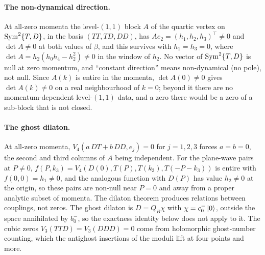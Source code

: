 \paragraph{The non-dynamical direction.}
At all-zero momenta the level-$(1, 1)$ block $A$ of the quartic vertex on $\operatorname{Sym}^2 \{T, D\}$, in the basis $(TT, TD, DD)$, has $A e_2 = (h_1, h_2, h_3)^\top \ne 0$ and $\det A \ne 0$ at both values of $\beta$, and this survives with $h_1 = h_3 = 0$, where $\det A = h_2 (h_0 h_4 - h_2^2) \ne 0$ in the window of $h_2$.
No vector of $\operatorname{Sym}^2 \{T, D\}$ is null at zero momentum, and ``constant direction'' means non-dynamical (no pole), not null.
Since $A(k)$ is entire in the momenta, $\det A(0) \ne 0$ gives $\det A(k) \ne 0$ on a real neighbourhood of $k = 0$; beyond it there are no momentum-dependent level-$(1, 1)$ data, and a zero there would be a zero of a sub-block that is not closed.

\paragraph{The ghost dilaton.}
At all-zero momenta, $V_4(a \, D T + b \, D D, e_j) = 0$ for $j = 1, 2, 3$ forces $a = b = 0$, the second and third columns of $A$ being independent.
For the plane-wave pairs at $P \ne 0$, $f(P, k_3) = V_4(D(0), T(P), T(k_3), T(- P - k_3))$ is entire with $f(0, 0) = h_1 \ne 0$, and the analogous function with $D(P)$ has value $h_2 \ne 0$ at the origin, so these pairs are non-null near $P = 0$ and away from a proper analytic subset of momenta.
The dilaton theorem produces relations between couplings, not zeros.
The ghost dilaton is $D = Q_B \chi$ with $\chi = c_0^- \ket{0}$, outside the space annihilated by $b_0^-$, so the exactness identity below does not apply to it.
The cubic zeros $V_3(TTD) = V_3(DDD) = 0$ come from holomorphic ghost-number counting, which the antighost insertions of the moduli lift at four points and more.

